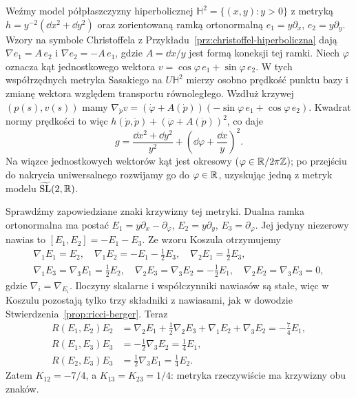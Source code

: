 \begin{przyklad}
\label{prz:thur-dop-tilde-sl-metryka}
Weźmy model półpłaszczyzny hiperbolicznej
$\mathbb H^2=\{(x,y):y>0\}$ z metryką
$h=y^{-2}(\dd x^2+\dd y^2)$ oraz zorientowaną
ramką ortonormalną $e_1=y\partial_x$, $e_2=y\partial_y$.
Wzory na symbole Christoffela z
Przykładu~\ref{prz:christoffel-hiperboliczna} dają
$\nabla e_1=A\,e_2$ i $\nabla e_2=-A\,e_1$,
gdzie $A=\dd x/y$ jest formą koneksji tej ramki.
Niech $\varphi$ oznacza kąt jednostkowego wektora
$v=\cos\varphi\,e_1+\sin\varphi\,e_2$.
W tych współrzędnych metryka Sasakiego na $U\mathbb H^2$
mierzy osobno prędkość punktu bazy i zmianę wektora
względem transportu równoległego. Wzdłuż krzywej $(p(s),v(s))$
mamy
$\nabla_{\dot p}v=(\dot\varphi+A(\dot p))
(-\sin\varphi\,e_1+\cos\varphi\,e_2)$.
Kwadrat normy prędkości to więc
$h(\dot p,\dot p)+(\dot\varphi+A(\dot p))^2$,
co daje
\begin{equation}\label{eq:thur-dop-tilde-sl-metryka}
 g=\frac{\dd x^2+\dd y^2}{y^2}
    +\left(\dd\varphi+\frac{\dd x}{y}\right)^2.
\end{equation}
Na wiązce jednostkowych wektorów kąt jest okresowy
($\varphi\in\mathbb{R}/2\pi\mathbb{Z}$); po przejściu do nakrycia
uniwersalnego rozwijamy go do $\varphi\in\mathbb{R}$,
uzyskując jedną z metryk modelu
$\widetilde{\mathrm{SL}}(2,\mathbb{R})$.

Sprawdźmy zapowiedziane znaki krzywizny tej metryki.
Dualna ramka ortonormalna ma postać
$E_1=y\partial_x-\partial_\varphi$, $E_2=y\partial_y$,
$E_3=\partial_\varphi$. Jej jedyny niezerowy nawias to
$[E_1,E_2]=-E_1-E_3$. Ze wzoru Koszula otrzymujemy
\[
 \begin{gathered}
 \nabla_1E_1=E_2,\quad
 \nabla_1E_2=-E_1-\tfrac12E_3,\quad
 \nabla_2E_1=\tfrac12E_3,\\
 \nabla_1E_3=\nabla_3E_1=\tfrac12E_2,\quad
 \nabla_2E_3=\nabla_3E_2=-\tfrac12E_1,\quad
 \nabla_2E_2=\nabla_3E_3=0,
 \end{gathered}
\]
gdzie $\nabla_i=\nabla_{E_i}$. Iloczyny skalarne i współczynniki
nawiasów są stałe, więc w Koszulu pozostają tylko trzy
składniki z nawiasami, jak w dowodzie
Stwierdzenia~\ref{prop:ricci-berger}. Teraz
\[
 \begin{aligned}
 R(E_1,E_2)E_2
 &=\nabla_2E_1+\tfrac12\nabla_2E_3
                   +\nabla_1E_2+\nabla_3E_2=-\tfrac74E_1,\\
 R(E_1,E_3)E_3&=-\tfrac12\nabla_3E_2=\tfrac14E_1,\\
 R(E_2,E_3)E_3&=\tfrac12\nabla_3E_1=\tfrac14E_2.
 \end{aligned}
\]
Zatem $K_{12}=-7/4$, a $K_{13}=K_{23}=1/4$:
metryka rzeczywiście ma krzywizny obu znaków.


\end{przyklad}
